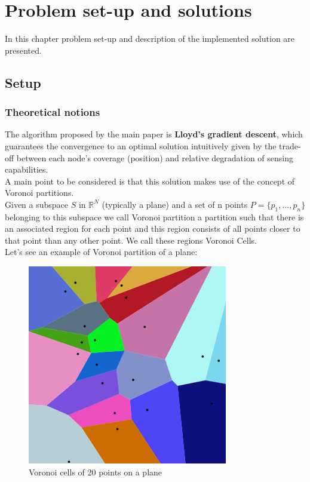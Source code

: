\documentclass[a4paper,11pt,oneside]{book}
\begin{document}
	
	\chapter{Problem set-up and solutions}
	In this chapter problem set-up and description of the implemented solution are presented. 
	
	\section{Setup}
	\subsection {Theoretical notions}
	
	The algorithm proposed by the main paper is \textbf{Lloyd's gradient descent}, which guarantees the convergence to an optimal solution intuitively given by the trade-off between each node's coverage (position) and relative degradation of sensing capabilities.\\
	A main point to be considered is that this solution makes use of the concept of Voronoi partitions.\\
	Given a subspace $S$ in $\mathbb{R}^N$ (typically a plane) and a set of n points $P=\{p_1,...,p_n\}$ belonging to this subspace we call Voronoi partition a partition such that there is an associated region for each point and this region consists of all points closer to that point than any other point. We call these regions Voronoi Cells.\\
	Let's see an example of Voronoi partition of a plane:\\
	
	\begin{figure}[hb]
		
		\centering
		
		\includegraphics[scale=0.33]{figs/VoronoiPartition.png}
		\caption{Voronoi cells of 20 points on a plane}\label{fig:Voronoi Partition.png}	
	\end{figure}
	
\end{document}
